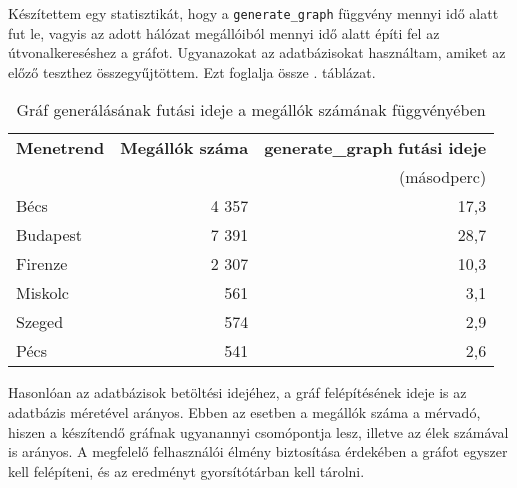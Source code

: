 Készítettem egy statisztikát, hogy a \texttt{generate\_graph} függvény mennyi idő alatt fut le, vagyis az adott hálózat megállóiból mennyi idő alatt építi fel az útvonalkereséshez a gráfot. Ugyanazokat az adatbázisokat használtam, amiket az előző teszthez összegyűjtöttem. Ezt foglalja össze . táblázat.

\begin{table}
\centering
\begin{tabular}{|l|r|r|}
\hline
\textbf{Menetrend} & \textbf{Megállók száma} & \textbf{generate\_graph} \textbf{futási ideje} \\
& & (másodperc) \\
\hline
Bécs & 4 357 & 17,3 \\
\hline
Budapest & 7 391 & 28,7 \\
\hline
Firenze & 2 307 & 10,3 \\
\hline
Miskolc & 561 & 3,1 \\
\hline
Szeged & 574 & 2,9 \\
\hline
Pécs & 541 & 2,6 \\
\hline
\end{tabular}
\caption{Gráf generálásának futási ideje a megállók számának függvényében}
\label{tab:runtime}
\end{table}

\newpage

Hasonlóan az adatbázisok betöltési idejéhez, a gráf felépítésének ideje is az adatbázis méretével arányos. Ebben az esetben a megállók száma a mérvadó, hiszen a készítendő gráfnak ugyanannyi csomópontja lesz, illetve az élek számával is arányos. A megfelelő felhasználói élmény biztosítása érdekében a gráfot egyszer kell felépíteni, és az eredményt gyorsítótárban kell tárolni.
